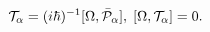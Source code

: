 \begin{equation}
{\cal T}_{\alpha}=(i\hbar)^{-1}[\Omega,\bar{{\cal P}}_{\alpha
}],\;[\Omega,{\cal T}_{\alpha}]=0.\label{2.4}%
\end{equation}

